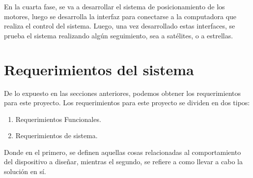 En la cuarta fase, se va a desarrollar el sistema de posicionamiento de los motores, luego se desarrolla la interfaz para conectarse a la computadora que realiza el control del sistema. Luego, una vez desarrollado estas interfaces, se prueba el sistema realizando algún seguimiento, sea a satélites, o a estrellas.  



















\section{ Requerimientos del sistema} \label{req_sist}

De lo expuesto en las secciones anteriores, podemos obtener los requerimientos para este proyecto. Los requerimientos para este proyecto se dividen en dos tipos:  
\begin{enumerate}
	\item Requerimientos Funcionales.  
	\item Requerimientos de sistema. 
\end{enumerate} 
Donde en el primero, se definen aquellas cosas relacionadas al comportamiento del dispositivo a diseñar, mientras el segundo, se refiere a como llevar a cabo la solución en sí. 


\renewcommand{\arraystretch}{1.5}

